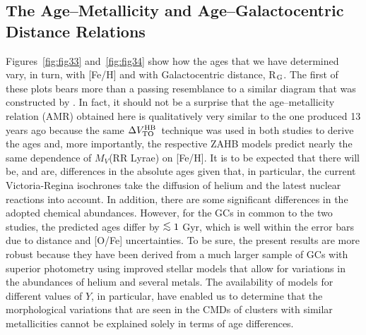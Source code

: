 \documentclass[12pt,preprint]{aastex}
\newcommand\delv{\Delta V^{\rm HB}_{\rm TO}}
\newcommand\lta{\mathrel{\hbox{\raise 0.6 ex \hbox{$<$}\kern
                   -1.8 ex\lower .5 ex\hbox{$\sim$}}}}
\begin{document}
\subsection{The Age--Metallicity and Age--Galactocentric Distance Relations}
\label{subsec:agefe}

Figures~\ref{fig:fig33} and~\ref{fig:fig34} show how the ages that we have
determined vary, in turn, with [Fe/H] and with Galactocentric distance,
R$_{\rm G}$.  The first of these plots bears more than a passing resemblance
to a similar diagram that was constructed by \citet[see his Fig.~40]{van00}.  In
fact, it should not be a surprise that the age--metallicity relation (AMR)
obtained here is qualitatively very similar to the one produced 13 years ago
because the same $\delv$\ technique was used in both studies to derive the ages
and, more importantly, the respective ZAHB models predict nearly the same
dependence of $M_V$(RR Lyrae) on [Fe/H].  It is to be expected that there will
be, and are, differences in the absolute ages given that, in particular, the
current Victoria-Regina isochrones take the diffusion of helium and the latest
nuclear reactions into account.  In addition, there are some significant
differences in the adopted chemical abundances.  However, for the GCs in common
to the two studies, the predicted ages differ by $\lta 1$ Gyr, which is well
within the error bars due to distance and [O/Fe] uncertainties.  To be sure, the
present results are more robust because they have been derived from a much
larger sample of GCs with superior photometry using improved stellar models that
allow for variations in the abundances of helium and several metals.  The
availability of models for different values of $Y$, in particular, have enabled
us to determine that the morphological variations that are seen in the CMDs of
clusters with similar metallicities cannot be explained solely in terms of age
differences.
\end{document}
